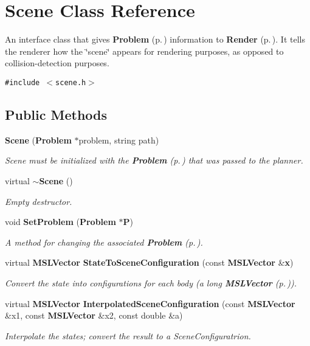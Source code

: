 \section{Scene  Class Reference}
\label{classScene}
An interface class that gives {\bf Problem} {\rm (p.\,\pageref{classProblem})} information to {\bf Render} {\rm (p.\,\pageref{classRender})}. It tells the renderer how the \char`\"{}scene\char`\"{} appears for rendering purposes, as opposed to collision-detection purposes. 


{\tt \#include $<$scene.h$>$}

\subsection*{Public Methods}
\begin{CompactItemize}
\item 
{\bf Scene} ({\bf Problem} $\ast$problem, string path)
\begin{CompactList}\small\item\em Scene must be initialized with the {\bf Problem} {\rm (p.\,\pageref{classProblem})} that was passed to the planner.\item\end{CompactList}\item 
virtual {\bf $\sim$Scene} ()
\begin{CompactList}\small\item\em Empty destructor.\item\end{CompactList}\item 
void {\bf Set\-Problem} ({\bf Problem} $\ast${\bf P})
\begin{CompactList}\small\item\em A method for changing the associated {\bf Problem} {\rm (p.\,\pageref{classProblem})}.\item\end{CompactList}\item 
virtual {\bf MSLVector} {\bf State\-To\-Scene\-Configuration} (const {\bf MSLVector} \&{\bf x})
\begin{CompactList}\small\item\em Convert the state into configurations for each body (a long {\bf MSLVector} {\rm (p.\,\pageref{classMSLVector})}).\item\end{CompactList}\item 
virtual {\bf MSLVector} {\bf Interpolated\-Scene\-Configuration} (const {\bf MSLVector} \&x1, const {\bf MSLVector} \&x2, const double \&a)
\begin{CompactList}\small\item\em Interpolate the states; convert the result to a Scene\-Configuratrion.\item\end{CompactList}\end{CompactItemize}
